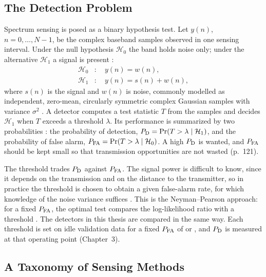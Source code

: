 \subsection{The Detection Problem}
\label{sec:detection-problem}

Spectrum sensing is posed as a binary hypothesis test. Let $y(n)$, $n = 0, \dots, N-1$, be the complex baseband samples observed in one sensing interval. Under the null hypothesis $\mathcal{H}_0$ the band holds noise only; under the alternative $\mathcal{H}_1$ a signal is present \parencite[p.~322]{axell2010}:
\begin{align}
  \mathcal{H}_0 &: \quad y(n) = w(n), \label{eq:h0}\\
  \mathcal{H}_1 &: \quad y(n) = s(n) + w(n), \label{eq:h1}
\end{align}
where $s(n)$ is the signal and $w(n)$ is noise, commonly modelled as independent, zero-mean, circularly symmetric complex Gaussian samples with variance $\sigma^2$ \parencite[p.~322]{axell2010}. A detector computes a test statistic $T$ from the samples and decides $\mathcal{H}_1$ when $T$ exceeds a threshold $\lambda$. Its performance is summarized by two probabilities \parencite[p.~121]{yucek2009}: the probability of detection, $P_{\mathrm{D}} = \Pr(T > \lambda \mid \mathcal{H}_1)$, and the probability of false alarm, $P_{\mathrm{FA}} = \Pr(T > \lambda \mid \mathcal{H}_0)$. A high $P_{\mathrm{D}}$ is wanted, and $P_{\mathrm{FA}}$ should be kept small so that transmission opportunities are not wasted (p.~121).

The threshold trades $P_{\mathrm{D}}$ against $P_{\mathrm{FA}}$. The signal power is difficult to know, since it depends on the transmission and on the distance to the transmitter, so in practice the threshold is chosen to obtain a given false-alarm rate, for which knowledge of the noise variance suffices \parencite[p.~121]{yucek2009}. This is the Neyman--Pearson approach: for a fixed $P_{\mathrm{FA}}$, the optimal test compares the log-likelihood ratio with a threshold \parencite[p.~322]{axell2010}. The detectors in this thesis are compared in the same way. Each threshold is set on idle validation data for a fixed $P_{\mathrm{FA}}$ of  or , and $P_{\mathrm{D}}$ is measured at that operating point (Chapter~3).

\subsection{A Taxonomy of Sensing Methods}
\label{sec:taxonomy}

